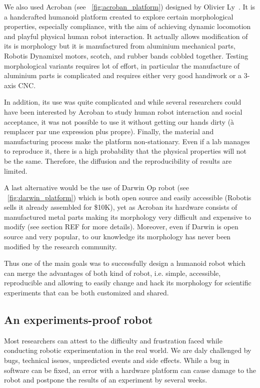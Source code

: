 We also used Acroban (see \figurename~\ref{fig:acroban_platform}) designed by Olivier Ly~\cite{Ly2010}. It is a handcrafted humanoid platform created to explore certain morphological properties, especially compliance, with the aim of achieving dynamic locomotion and playful physical human robot interaction.
It actually allows modification of its is morphology but it is manufactured from aluminium mechanical parts, Robotis Dynamixel motors, scotch, and rubber bands cobbled together. Testing morphological variants requires lot of effort, in particular the manufacture of aluminium parts is complicated and requires either very good handiwork or a 3-axis CNC.

In addition, its use was quite complicated and while several researchers could have been interested by Acroban to study human robot interaction and social acceptance, it was not possible to use it without getting our hands dirty (à remplacer par une expression plus propre).
Finally, the material and manufacturing process make the platform non-stationary. Even if a lab manages to reproduce it, there is a high probability that the physical properties will not be the same. Therefore, the diffusion and the reproducibility of results are limited.


A last alternative would be the use of Darwin Op robot (see \figurename~\ref{fig:darwin_platform}) which is both open source and easily accessible (Robotis sells it already assembled for \$10K), yet as Acroban its hardware consists of manufactured metal parts making its morphology very difficult and expensive to modify (see section REF for more details). Moreover, even if Darwin is open source and very popular, to our knowledge its morphology has never been modified by the research community.

Thus one of the main goals was to successfully design a humanoid robot which can merge the advantages of both kind of robot, i.e. simple, accessible, reproducible and allowing to easily change and hack its morphology for scientific experiments that can be both customized and shared.


\subsection{An experiments-proof robot} %

Most researchers can attest to the difficulty and frustration faced while conducting robotic experimentation in the real world. We are daly challenged by bugs, technical issues, unpredicted events and side effects. While a bug in software can be fixed, an error with a hardware platform can cause damage to the robot and postpone the results of an experiment by several weeks.

